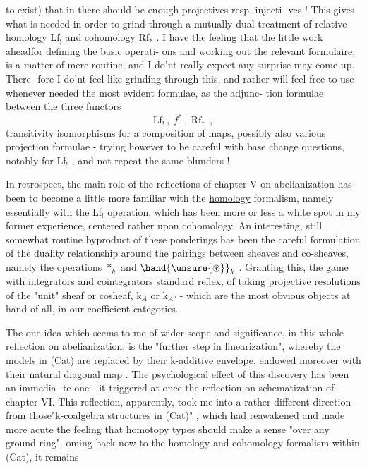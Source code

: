 
to exist)  that in  there should be enough projectives resp. injecti-%
ves !  This gives what is needed in order to grind through a mutually
dual treatment of relative homology Lf$_{!}$  and cohomology Rf$_{*}$ .  I have
the feeling that the little work ahead\hand{\unsure{,}}for defining the basic operati-%
ons and working out the relevant formulaire, is a matter of mere
routine,  and I do'nt really expect any surprise may come up.  There-%
fore I do'nt feel like grinding through this,  and rather will feel
free to use whenever needed the most evident formulae,  as the adjunc-%
tion formulae between the three functors
\[ \mathrm{Lf}_{!}\ ,\ f^{*}\ ,\ \mathrm{Rf}_{*}\ \ , \]
transitivity isomorphisms for a composition of maps,  possibly also
various projection formulae  -  trying however to be careful with
base change questions,  notably for Lf$_{!}$ ,  and not repeat the same
blunders !

In retrospect,  the main role of the reflections of chapter V
on abelianization has been to become a little more familiar with the
\uline{homology} formalism, namely essentially with the Lf$_{!}$ operation, which
has been more or less a white spot in my former experience,  centered
rather upon cohomology.   An interesting,  still somewhat routine
byproduct of these ponderings has been the careful formulation of the
duality relationship  around the pairings between sheaves and
co-sheaves, namely the operations $*_{k}$ and $\hand{\unsure{\circledast}}_{k}$ .  Granting this,  the
game with integrators and cointegrators  standard
reflex,  of taking projective resolutions of the "unit" sheaf or
cosheaf,  k$_{A}$ or k$_{A^{o}}$  - which are the most obvious objects at hand of
all,   in our coefficient categories.

The  one idea which seems to me of wider scope and significance,
in this whole reflection on abelianization,  is the "further step in
linearization",  whereby the models in (Cat) are replaced by their
k-additive envelope,  endowed moreover with their natural \uline{diagonal}
\uline{map} .  The psychological effect of this discovery has been an immedia-%
te one  -   it triggered at once the reflection on schematization
of chapter VI.  This reflection,  apparently,  took me into a rather
different direction from those\hand{$\vert$}"k-coalgebra structures in (Cat)" ,
which had reawakened and made more acute the feeling that homotopy
types should make a sense "over any ground ring".  oming back now to
the homology and cohomology formalism within (Cat),  it remains 

